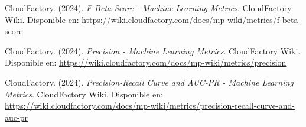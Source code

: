 \documentclass{article}
\begin{document}
\begin{thebibliography}{9}
CloudFactory. (2024). \textit{F-Beta Score - Machine Learning Metrics}. CloudFactory Wiki. 
Disponible en: \url{https://wiki.cloudfactory.com/docs/mp-wiki/metrics/f-beta-score}

CloudFactory. (2024). \textit{Precision - Machine Learning Metrics}. CloudFactory Wiki. 
Disponible en: \url{https://wiki.cloudfactory.com/docs/mp-wiki/metrics/precision}

CloudFactory. (2024). \textit{Precision-Recall Curve and AUC-PR - Machine Learning Metrics}. CloudFactory Wiki. 
Disponible en: \url{https://wiki.cloudfactory.com/docs/mp-wiki/metrics/precision-recall-curve-and-auc-pr}

\end{thebibliography}
\end{document}
